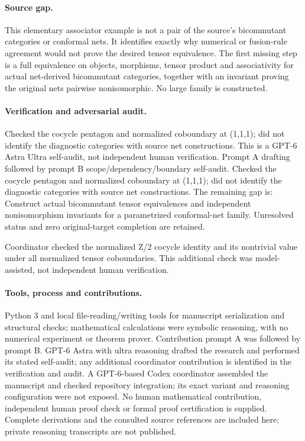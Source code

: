 \documentclass[11pt]{article}
\begin{document}
\paragraph{Source gap.} This elementary associator example is not a pair of the source's bicommutant categories or conformal nets. It identifies exactly why numerical or fusion-rule agreement would not prove the desired tensor equivalence. The first missing step is a full equivalence on objects, morphisms, tensor product and associativity for actual net-derived bicommutant categories, together with an invariant proving the original nets pairwise nonisomorphic. No large family is constructed.

\paragraph{Verification and adversarial audit.}
Checked the cocycle pentagon and normalized coboundary at (1,1,1); did not identify the diagnostic categories with source net constructions. This is a GPT-6 Astra Ultra self-audit, not independent human verification. Prompt A drafting followed by prompt B scope/dependency/boundary self-audit. Checked the cocycle pentagon and normalized coboundary at (1,1,1); did not identify the diagnostic categories with source net constructions. The remaining gap is: Construct actual bicommutant tensor equivalences and independent nonisomorphism invariants for a parametrized conformal-net family. Unresolved status and zero original-target completion are retained.

Coordinator checked the normalized Z/2 cocycle identity and its nontrivial value under all normalized tensor coboundaries. This additional check was model-assisted, not independent human verification.

\paragraph{Tools, process and contributions.}
Python 3 and local file-reading/writing tools for manuscript serialization and structural checks; mathematical calculations were symbolic reasoning, with no numerical experiment or theorem prover. Contribution prompt A was followed by prompt B. GPT-6 Astra with ultra reasoning drafted the research and performed its stated self-audit; any additional coordinator contribution is identified in the verification and audit. A GPT-6-based Codex coordinator assembled the manuscript and checked repository integration; its exact variant and reasoning configuration were not exposed. No human mathematical contribution, independent human proof check or formal proof certification is supplied. Complete derivations and the consulted source references are included here; private reasoning transcripts are not published.
\end{document}
